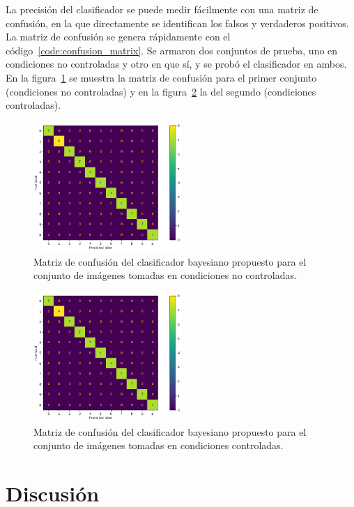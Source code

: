 La precisión del clasificador se puede medir fácilmente con una matriz de confusión, en la que directamente se identifican los falsos y verdaderos positivos.
La matriz de confusión se genera rápidamente con el código~\ref{code:confusion_matrix}.
Se armaron dos conjuntos de prueba, uno en condiciones no controladas y otro en que sí, y se probó el clasificador en ambos.
En la figura~\ref{fig:confusion_matrix_bad} se muestra la matriz de confusión para el primer conjunto (condiciones no controladas) y en la figura~\ref{fig:confusion_matrix_good} la del segundo (condiciones controladas).
\vfill
%
\begin{figure}[h!]
    \caption{Matriz de confusión del clasificador bayesiano propuesto para el conjunto de imágenes tomadas en condiciones no controladas.}
    \label{fig:confusion_matrix_bad}
    \centering
    \includegraphics[width=0.5\textwidth]{3_Reconocimiento/Figs/confusion_matrix_good}
\end{figure}
%
\begin{figure}[h!]
    \caption{Matriz de confusión del clasificador bayesiano propuesto para el conjunto de imágenes tomadas en condiciones controladas.}
    \label{fig:confusion_matrix_good}
    \centering
    \includegraphics[width=0.5\textwidth]{3_Reconocimiento/Figs/confusion_matrix_good}
\end{figure}


\section*{Discusión}


